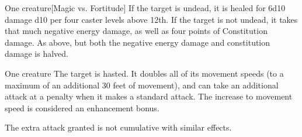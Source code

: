 \begin{comment}
\subsubsection{H}
\end{comment}

\begin{spellheader}
    \spellrng{\rngclose}
\end{spellheader}
\begin{spelleffects}
    \begin{spelltarget}{One creature}[Magic vs. Fortitude]
        \spelleffect If the target is undead, it is healed for 6d10 damage \add d10 per four caster levels above 12th.
        \spellsuccess If the target is not undead, it takes that much negative energy damage, as well as four points of Constitution damage.
        \spellfailure As above, but both the negative energy damage and constitution damage is halved.
    \end{spelltarget}
\end{spelleffects}
\begin{spellfooter}
    
\end{spellfooter}

\begin{spellheader}
    \spelldur{\durshort}
\end{spellheader}
\begin{spelleffects}
    \begin{spelltarget}{One creature}
        \spelleffect The target is hasted. It doubles all of its movement speeds (to a maximum of an additional 30 feet of movement), and can take an additional attack at a  penalty when it makes a standard attack. The increase to movement speed is considered an enhancement bonus.
    \end{spelltarget}
\end{spelleffects}
\begin{spellfooter}
    \spellnotes The extra attack granted is not cumulative with similar effects.
\end{spellfooter}

